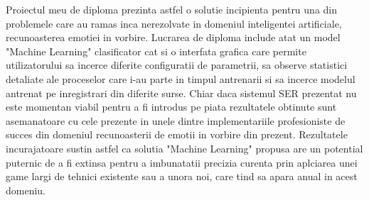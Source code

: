 \documentclass[a4paper,12pt]{book}
\begin{document}
		
		Proiectul meu de diploma prezinta astfel o solutie incipienta pentru una din problemele care au ramas inca nerezolvate in domeniul inteligentei artificiale, recunoasterea emotiei in vorbire. Lucrarea de diploma include atat un model "Machine Learning" clasificator cat si o interfata grafica care permite utilizatorului sa incerce diferite configuratii de parametrii, sa observe statistici detaliate ale proceselor care i-au parte in timpul antrenarii si sa incerce modelul antrenat pe inregistrari din diferite surse. Chiar daca sistemul SER prezentat nu este momentan viabil pentru a fi introdus pe piata rezultatele obtinute sunt asemanatoare cu cele prezente in unele dintre implementariile profesioniste de succes din domeniul recunoasterii de emotii in vorbire din prezent. Rezultatele incurajatoare sustin astfel ca solutia "Machine Learning" propusa are un potential puternic de a fi extinsa pentru a imbunatatii precizia curenta prin aplciarea unei game largi de tehnici existente sau a unora noi, care tind sa apara anual in acest domeniu. 
		
		
		\renewcommand{\clearpage}{}
		\printbibliography[title={Bibliografie},notcategory=cited,resetnumbers=true]
		\printbibliography[title={Referinte},category=cited,resetnumbers=true]
		\newpage
\end{document}
